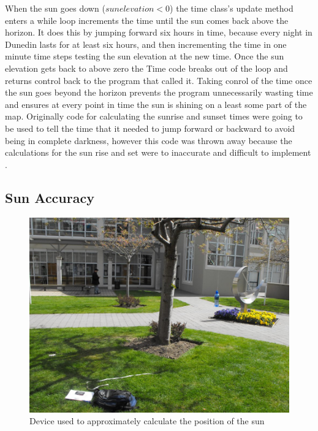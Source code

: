 \documentclass[12pt]{report}
\begin{document}
When the sun goes down ($sun elevation < 0$) the time class's update method enters a while loop increments the time until the sun comes back above the horizon. It does this by jumping forward six  hours in time, because every night in Dunedin lasts for at least six hours, and then incrementing the time in one minute time steps testing the sun elevation at the new time. Once the sun elevation gets back to above zero the Time code breaks out of the loop and returns control back to the program that called it. Taking conrol of the time once the sun goes beyond the horizon prevents the program unnecessarily wasting time and ensures at every point in time the sun is shining on a least some part of the map. Originally code for calculating the sunrise and sunset times were going to be used to tell the time that it needed to jump forward or backward to avoid being in complete darkness, however this code was thrown away because the calculations for the sun rise and set were to inaccurate and difficult to implement .\\%


\subsection{Sun Accuracy}

\begin{figure}
\includegraphics[scale=0.4]{contraption.jpg}
\caption{Device used to approximately calculate the position of the sun}
\label{image:sun-contraption}
\end{figure}
\end{document}
